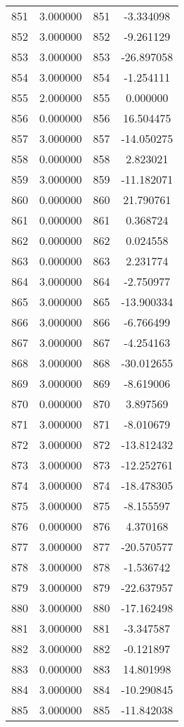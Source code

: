 \documentclass[12pt]{article}
\begin{document}
\begin{longtable}{@{}cccc@{}}
851 & 3.000000 & 851 & -3.334098 \\
852 & 3.000000 & 852 & -9.261129 \\
853 & 3.000000 & 853 & -26.897058 \\
854 & 3.000000 & 854 & -1.254111 \\
855 & 2.000000 & 855 & 0.000000 \\
856 & 0.000000 & 856 & 16.504475 \\
857 & 3.000000 & 857 & -14.050275 \\
858 & 0.000000 & 858 & 2.823021 \\
859 & 3.000000 & 859 & -11.182071 \\
860 & 0.000000 & 860 & 21.790761 \\
861 & 0.000000 & 861 & 0.368724 \\
862 & 0.000000 & 862 & 0.024558 \\
863 & 0.000000 & 863 & 2.231774 \\
864 & 3.000000 & 864 & -2.750977 \\
865 & 3.000000 & 865 & -13.900334 \\
866 & 3.000000 & 866 & -6.766499 \\
867 & 3.000000 & 867 & -4.254163 \\
868 & 3.000000 & 868 & -30.012655 \\
869 & 3.000000 & 869 & -8.619006 \\
870 & 0.000000 & 870 & 3.897569 \\
871 & 3.000000 & 871 & -8.010679 \\
872 & 3.000000 & 872 & -13.812432 \\
873 & 3.000000 & 873 & -12.252761 \\
874 & 3.000000 & 874 & -18.478305 \\
875 & 3.000000 & 875 & -8.155597 \\
876 & 0.000000 & 876 & 4.370168 \\
877 & 3.000000 & 877 & -20.570577 \\
878 & 3.000000 & 878 & -1.536742 \\
879 & 3.000000 & 879 & -22.637957 \\
880 & 3.000000 & 880 & -17.162498 \\
881 & 3.000000 & 881 & -3.347587 \\
882 & 3.000000 & 882 & -0.121897 \\
883 & 0.000000 & 883 & 14.801998 \\
884 & 3.000000 & 884 & -10.290845 \\
885 & 3.000000 & 885 & -11.842038 \\

\end{longtable}
\end{document}
